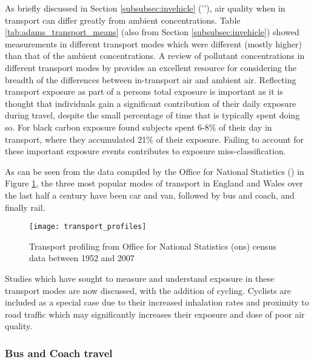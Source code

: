 As briefly discussed in Section \ref{subsubsec:invehicle} (''), air quality when in transport can differ greatly from ambient concentrations. Table \ref{tab:adams_transport_means} (also from Section \ref{subsubsec:invehicle}) showed measurements in different transport modes which were different (mostly higher) than that of the ambient concentrations. A review of pollutant concentrations in different transport modes by \cite{Karanasiou2014} provides an excellent resource for considering the breadth of the differences between in-transport air and ambient air. Reflecting transport exposure as part of a persons total exposure is important as it is thought that individuals gain a significant contribution of their daily exposure during travel, despite the small percentage of time  that is typically spent doing so. For black carbon exposure \cite{Dons2011} found subjects spent 6-8\% of  their day in transport, where they accumulated 21\% of their exposure. Failing to account for these important exposure events contributes to exposure miss-classification. 

As can be seen from the data compiled by the Office for National Statistics (\cite{OfficeforNationalStatistics2010}) in Figure \ref{fig:transportprofiles}, the three most popular modes of transport in England and Wales over the last half a century have been car and van, followed by bus and coach, and finally rail. 

\begin{figure}[H]
\centering
\texttt{[image: transport\_profiles]}
\caption{Transport profiling from Office for National Statistics (\gls{ons}) census data between 1952 and 2007}
\label{fig:transportprofiles}
\end{figure}

Studies which have sought to measure and understand exposure in these transport modes are now discussed, with the addition of cycling. Cyclists are included as a special case due to their increased inhalation rates and proximity to road traffic which may significantly increases their exposure and dose of poor air quality.



\subsubsection{Bus and Coach travel}
\label{sec:bus_and_coach}

